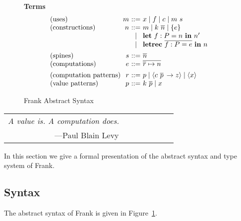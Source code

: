 \documentclass{sigplanconf}
\makeatletter
\newcommand{\fighead}{\textbf}
\newcommand{\many}{\overline}
\newcommand\ba{\begin{array}}
\newcommand\ea{\end{array}}
\newenvironment{syntax}{\[\ba{@{}l@{~}r@{~}c@{~}l@{}}}{\ea\]\ignorespacesafterend}
\newcommand{\key}[1]{\mathbf{#1}} %
\newcommand{\handleSymbol}{\rightarrow}
\newcommand{\handle}[2]{{#1} \handleSymbol {#2}}
\newcommand{\thunk}[1]{\{{#1}\}}
\newcommand{\force}[1]{{#1}!}
\newcommand\slab[1]{(\textrm{#1})}
\newcommand{\effin}[1]{\langle {#1} \rangle}
\makeatother
\begin{document}
\begin{figure}
\fighead{Terms}
\begin{syntax}
\slab{uses}               &m       &::=& x \mid f \mid c \mid m~s \\
\slab{constructions}      &n       &::=& m \mid k~\many{n} \mid \thunk{e} \\
                       &       &\mid& \key{let}~f : P = n~\key{in}~n' \\
                       &       &\mid& \key{letrec}~\many{f : P = e}~\key{in}~n \\
[1ex]
\slab{spines}          &s       &::=& \many{n} \\
\slab{computations}     &e       &::=& \many{\many{r} \mapsto n}
\\[1ex]
\slab{computation patterns}&r &::=& p
                               \mid \effin{\handle{c~\many{p}\,}{z}}
                               \mid \effin{x} \\
\slab{value patterns}&p       &::=& k~\many{p} \mid x        \\
\end{syntax}

\caption{Frank Abstract Syntax}
\label{fig:frank-syntax}
\end{figure}

\begin{center}
\begin{tabular}{c}
{\em A value is. A computation does.} $\qquad \qquad \qquad $\\
\hfill---Paul Blain Levy~\cite{Levy2004}
\end{tabular}
\end{center}
%
In this section we give a formal presentation of the abstract syntax
and type system of Frank.

\subsection{Syntax}
%
The abstract syntax of Frank is given in
Figure~\ref{fig:frank-syntax}.
\end{document}
